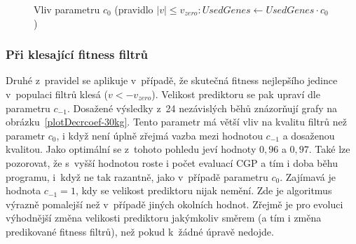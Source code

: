 \begin{figure}[htb]
    \centering
    \caption{Vliv parametru $c_0$ (pravidlo $\left|v\right| \leq v_\mathit{zero}: \mathit{UsedGenes} \leftarrow \mathit{UsedGenes} \cdot c_0$)}
    \label{plotZerocoef-30kg}
\end{figure}

\subsubsection*{Při klesající fitness filtrů}

Druhé z~pravidel se aplikuje v~případě, že skutečná fitness nejlepšího jedince v~populaci filtrů klesá ($v < -v_\mathit{zero}$). Velikost prediktoru se pak upraví dle parametru $c_{-1}$. Dosažené výsledky z~24 nezávislých běhů znázorňují grafy na obrázku~\ref{plotDecrcoef-30kg}. Tento parametr má větší vliv na kvalitu filtrů než parametr $c_0$, i když není úplně zřejmá vazba mezi hodnotou $c_{-1}$ a dosaženou kvalitou. Jako optimální se z~tohoto pohledu jeví hodnoty $0,96$ a $0,97$. Také lze pozorovat, že s~vyšší hodnotou roste i počet evaluací CGP a tím i doba běhu programu, i~když ne tak razantně, jako v~případě parametru $c_0$. Zajímavá je hodnota $c_{-1} = 1$, kdy se velikost prediktoru nijak nemění. Zde je algoritmus výrazně pomalejší než v~případě jiných okolních hodnot. Zřejmě je pro evoluci výhodnější změna velikosti prediktoru jakýmkoliv směrem (a tím i změna predikované fitness filtrů), než pokud k~žádné úpravě nedojde.

